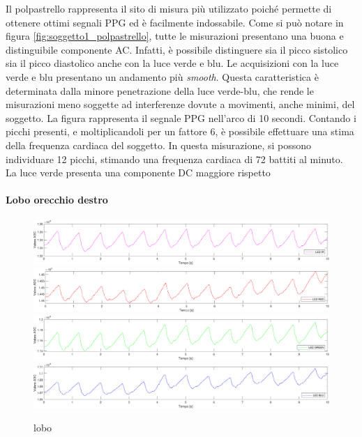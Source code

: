 Il polpastrello rappresenta il sito di misura più utilizzato poiché permette di ottenere ottimi segnali PPG ed è facilmente indossabile. Come si può notare in figura \ref{fig:soggetto1_polpastrello}, tutte le misurazioni presentano una buona e distinguibile componente AC. Infatti, è possibile distinguere sia il picco sistolico sia il picco diastolico anche con la luce verde e blu. Le acquisizioni con la luce verde e blu presentano un andamento più \textit{smooth}. Questa caratteristica è determinata dalla minore penetrazione della luce verde-blu, che rende le misurazioni meno soggette ad interferenze dovute a movimenti, anche minimi, del soggetto. La figura rappresenta il segnale PPG nell'arco di 10 secondi. Contando i picchi presenti, e moltiplicandoli per un fattore 6, è possibile effettuare una stima della frequenza cardiaca del soggetto. In questa misurazione, si possono individuare 12 picchi, stimando una frequenza cardiaca di 72 battiti al minuto. La luce verde presenta una componente DC maggiore rispetto 

\paragraph{Lobo orecchio destro}
\begin{figure}[h]
	\centering
	\includegraphics[width=1\linewidth]{ImageFiles/Misure Preliminari/Soggetto 1/lobo_ired}
	\includegraphics[width=1\linewidth]{ImageFiles/Misure Preliminari/Soggetto 1/lobo_red}
	\includegraphics[width=1\linewidth]{ImageFiles/Misure Preliminari/Soggetto 1/lobo_green}
	\includegraphics[width=1\linewidth]{ImageFiles/Misure Preliminari/Soggetto 1/lobo_blu}
	\caption{lobo}
	\label{fig:Descrizione_Segnale_PPG}
\end{figure}


